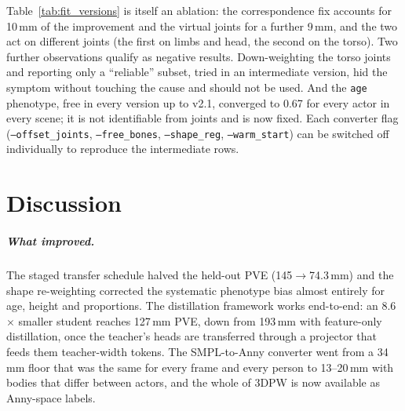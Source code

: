 Table~\ref{tab:fit_versions} is itself an ablation: the correspondence fix
accounts for 10\,mm of the improvement and the virtual joints for a further
9\,mm, and the two act on different joints (the first on limbs and head, the
second on the torso). Two further observations qualify as negative results.
Down-weighting the torso joints and reporting only a ``reliable'' subset,
tried in an intermediate version, hid the symptom without touching the cause
and should not be used. And the \texttt{age} phenotype, free in every version
up to v2.1, converged to 0.67 for every actor in every scene; it is not
identifiable from joints and is now fixed. Each converter flag
(\texttt{--offset\_joints}, \texttt{--free\_bones}, \texttt{--shape\_reg},
\texttt{--warm\_start}) can be switched off individually to reproduce the
intermediate rows.

\chapter{Discussion}
\label{ch:discussion}

\paragraph{What improved.} The staged transfer schedule halved the held-out
PVE (145$\rightarrow$74.3\,mm) and the shape re-weighting corrected the
systematic phenotype bias almost entirely for age, height and proportions. The
distillation framework works end-to-end: an 8.6$\times$ smaller student
reaches 127\,mm PVE, down from 193\,mm with feature-only distillation, once
the teacher's heads are transferred through a projector that feeds them
teacher-width tokens. The SMPL-to-Anny converter went from a 34\,mm floor that
was the same for every frame and every person to 13--20\,mm with bodies that
differ between actors, and the whole of 3DPW is now available as Anny-space
labels.

